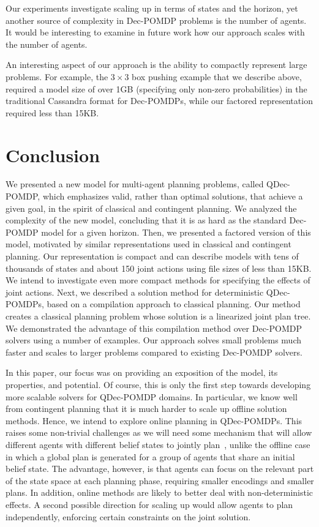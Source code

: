 \documentclass[letterpaper]{article}
\theoremstyle{definition}
\begin{document}
Our experiments investigate scaling up in terms of states and the horizon, yet another source of complexity in Dec-POMDP problems is the number of agents. It would be interesting to examine in future work how our approach scales with the number of agents.

An interesting aspect of our approach is the ability to compactly represent large problems. For example, the $3 \times 3$ box pushing example that we describe above, required a model size of over 1GB (specifying only non-zero probabilities) in the traditional Cassandra format for Dec-POMDPs, while our factored representation required less than 15KB.

\section{Conclusion}

We presented a new model for multi-agent planning problems, called QDec-POMDP, which emphasizes valid, rather than optimal solutions, that achieve a given goal, in the spirit of classical and contingent planning. We analyzed the complexity of the new model, concluding that it is as hard as the standard Dec-POMDP model for a given horizon. Then, we presented a factored version of this model, motivated by similar representations used in classical and contingent planning. Our representation is compact and can describe models with tens of thousands of states and about 150 joint actions using file sizes of less than 15KB. We intend to investigate even more compact methods for specifying the effects of joint actions. Next, we described a solution method for deterministic QDec-POMDPs, based on a compilation approach to classical planning. Our method creates a classical planning problem whose solution is a linearized joint plan tree. We demonstrated the advantage of this compilation method over Dec-POMDP solvers using a number of examples. Our approach solves small problems much faster and scales to larger problems compared to existing Dec-POMDP solvers.

In this paper, our focus was on providing an exposition of the model, its properties, and potential. Of course, this is only the first step towards developing more scalable solvers for QDec-POMDP domains. In particular, we know well from contingent planning that it is much harder to scale up offline solution methods. Hence, we intend to explore online planning in QDec-POMDPs. This raises some non-trivial challenges as we will need some mechanism that will allow different agents with different belief states to jointly plan~\cite{WZCaij11}, unlike the offline case in which a global plan is generated for a group of agents that share an initial belief state. The advantage, however, is that agents can focus on the relevant part of the state space at each planning phase, requiring smaller encodings and smaller plans. In addition, online methods are likely to better deal with non-deterministic effects.
A second possible direction for scaling up would allow agents to plan independently, enforcing certain constraints on the joint solution.
\end{document}
